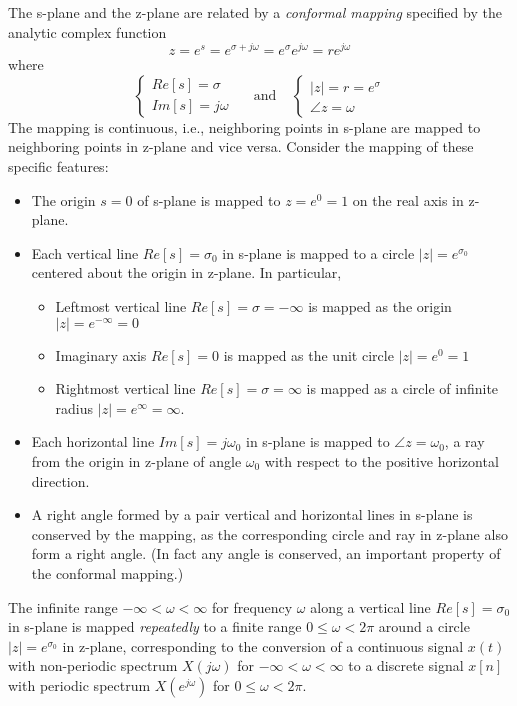 The s-plane and the z-plane are related by a {\em conformal mapping} specified
by the analytic complex function 
\[	z=e^s=e^{\sigma+j\omega}=e^\sigma e^{j\omega}=r e^{j\omega}	\]
where 
\[ \left\{ \begin{array}{l} Re[s]=\sigma \\ Im[s]=j\omega \end{array} \right.
	\;\;\;\;\;\mbox{and}\;\;\;\;
	\left\{ \begin{array}{l} |z|=r=e^\sigma \\ \angle{z}=\omega 
	\end{array} \right.
\]
The mapping is continuous, i.e., neighboring points in s-plane are mapped
to neighboring points in z-plane and vice versa. Consider the mapping of these 
specific features: 
\begin{itemize}
\item The origin $s=0$ of s-plane is mapped to $z=e^0=1$ on the real axis in
	z-plane.
\item Each vertical line $Re[s]=\sigma_0$ in s-plane is mapped to a circle 
	$|z|=e^{\sigma_0}$ centered about the origin in z-plane. In particular,
	\begin{itemize}
	\item Leftmost vertical line $Re[s]=\sigma=-\infty$ is mapped as the 
		origin $|z|=e^{-\infty}=0$
	\item Imaginary axis $Re[s]=0$ is mapped as the unit circle 
		$|z|=e^0=1$
	\item Rightmost vertical line $Re[s]=\sigma=\infty$ is mapped as a 
		circle of infinite radius $|z|=e^{\infty}=\infty$.
	\end{itemize}
\item Each horizontal line $Im[s]=j\omega_0$ in s-plane is mapped to 
	$\angle{z}=\omega_0$, a ray from the origin in z-plane of angle 
	$\omega_0$ with respect to the positive horizontal direction. 
\item A right angle formed by a pair vertical and horizontal lines in s-plane
	is conserved by the mapping, as the corresponding circle and ray in z-plane 
	also form a right angle. (In fact any angle is conserved, an important
	property of the conformal mapping.)
\end{itemize}
The infinite range $-\infty < \omega < \infty$ for frequency $\omega$ along a 
vertical line $Re[s]=\sigma_0$ in s-plane is mapped {\em repeatedly} to a finite 
range $0 \le \omega < 2\pi$ around a circle $|z|=e^{\sigma_0}$ in z-plane, 
corresponding to the conversion of a continuous signal $x(t)$ with non-periodic 
spectrum $X(j\omega)$ for $-\infty < \omega < \infty$ to a discrete signal $x[n]$ 
with periodic spectrum $X(e^{j\omega})$ for $0 \le \omega < 2\pi$.

